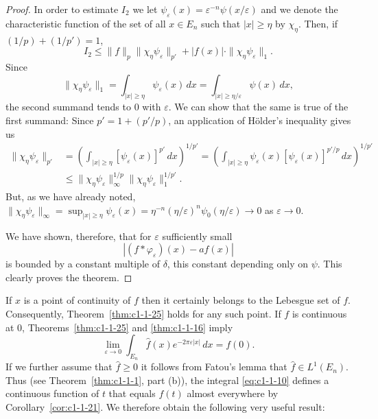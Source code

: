 \begin{proof}
In order to estimate $I_{2}$ we let
$\psi_{\varepsilon}(x) = \varepsilon^{-n}\psi(x/\varepsilon)$ and we denote the
characteristic function of the set of all $x \in E_{n}$ such that $|x| \geq \eta$
by $\chi_{\eta}$. Then, if $(1/p) + (1/p') = 1$,
\[
I_{2}\leq\|f\|_{p}\|\chi_{\eta}\psi_{\varepsilon}\|_{p'}+|f(x)|\cdot\|\chi_{\eta}\psi_{\varepsilon}\|_{1}.
\]
Since
\[
\|\chi_{\eta}\psi_{\varepsilon}\|_{1}
=\int_{|x|\geq\eta}\psi_{\varepsilon}(x)\,dx
=\int_{|x|\geq\eta/\varepsilon}\psi(x)\,dx,
\]
the second summand tends to $0$ with $\varepsilon$. We can show that the same is
true of the first summand: Since $p' = 1 + (p'/p)$, an application of H\"older's
inequality gives us
\begin{align*}
\|\chi_{\eta}\psi_{\varepsilon}\|_{p'}
&=\left(\int_{|x|\geq\eta}[\psi_{\varepsilon}(x)]^{p'}\,dx\right)^{1/p'}
=\left(\int_{|x|\geq\eta}\psi_{\varepsilon}(x)[\psi_{\varepsilon}(x)]^{p'/p}\,dx\right)^{1/p'}\\
&\leq\|\chi_{\eta}\psi_{\varepsilon}\|_{\infty}^{1/p}\|\chi_{\eta}\psi_{\varepsilon}\|_{1}^{1/p'}.
\end{align*}
But, as we have already noted,
$\|\chi_{\eta}\psi_{\varepsilon}\|_{\infty} = \sup_{|x| \geq \eta} \psi_{\varepsilon}(x) = \eta^{-n}(\eta/\varepsilon)^{n}\allowbreak\psi_{0}(\eta/\varepsilon) \to 0$
as $\varepsilon \to 0$.

We have shown, therefore, that for $\varepsilon$ sufficiently small
\[
|(f*\varphi_{\varepsilon})(x)-af(x)|
\]
is bounded by a constant multiple of $\delta$, this constant depending only on
$\psi$. This clearly proves the theorem.
\end{proof}

If $x$ is a point of continuity of $f$ then it certainly belongs to the Lebesgue
set of $f$. Consequently, Theorem~\ref{thm:c1-1-25} holds for any such point. If
$f$ is continuous at $0$, Theorems~\ref{thm:c1-1-25} and \ref{thm:c1-1-16} imply
\[
\lim_{\varepsilon\to0}\int_{E_{n}}\hat{f}(x)e^{-2\pi\varepsilon|x|}\,dx=f(0).
\]
If we further assume that $\hat{f} \geq 0$ it follows from Fatou's lemma that
$\hat{f} \in L^{1}(E_{n})$. Thus (see Theorem~\ref{thm:c1-1-1}, part (b)), the
integral \eqref{eq:c1-1-10} defines a continuous function of $t$ that equals
$f(t)$ almost everywhere by Corollary~\ref{cor:c1-1-21}. We therefore obtain the
following very useful result:

